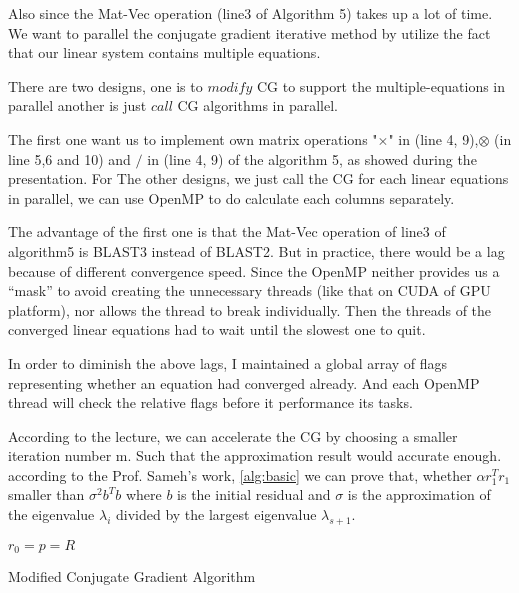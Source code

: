 Also since the Mat-Vec operation (line3 of Algorithm 5) takes up a lot of time. We want to parallel the conjugate gradient iterative method by utilize the fact that our linear system contains multiple equations. 

There are two designs, one is to $modify$ CG to support the multiple-equations in parallel another is just $call$ CG algorithms in parallel.

The first one want us to implement own  matrix operations "$\times$" in (line 4, 9),$\otimes$ (in line 5,6 and 10) and $/$ in (line 4, 9) of the algorithm 5, as showed during the presentation. For The other designs, we just call the CG for each linear equations in parallel, we can use OpenMP to do calculate each columns separately.

The advantage of the first one is that the Mat-Vec operation of line3 of algorithm5 is BLAST3 instead of BLAST2. But in practice, there would be a lag because of different convergence speed. Since the OpenMP neither provides us a “mask” to avoid creating the unnecessary threads (like that on CUDA of GPU platform), nor allows the thread to break individually. Then the threads of the converged linear equations had to wait until the slowest one to quit. 
 
In order to diminish the above lags, I maintained a global array of flags representing whether an equation had converged already. And each OpenMP thread will check the relative flags before it performance its tasks.

According to the lecture, we can accelerate the CG by choosing a smaller iteration number m. Such that the approximation result would accurate enough. according to the Prof. Sameh's work, \ref{alg:basic} we can prove that, whether $\alpha r_1^Tr_1$ smaller than $\sigma^2b^Tb$ where $b$ is the initial residual and $\sigma$ is the approximation of the eigenvalue $\lambda_i$ divided by the largest eigenvalue $\lambda_{s+1} $.  
\begin{algorithm}[h]
	\SetArgSty{}
	{$r_0 = p = R$\;}
	\caption{Modified Conjugate Gradient Algorithm}
	\label{alg:modifiedcg}
\end{algorithm}


